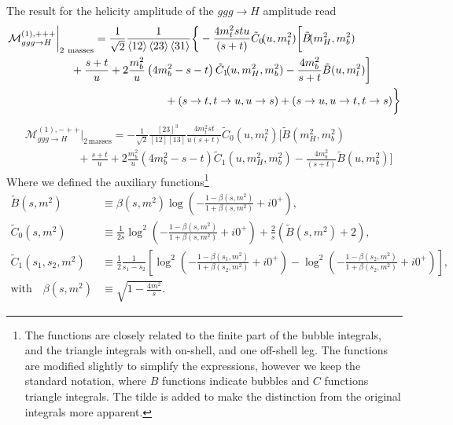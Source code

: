 The result for the helicity amplitude of the $ggg \rightarrow H$ amplitude read
\begin{equation}
\begin{split}
&\mathcal{M}^{(1),+++}_{ggg \rightarrow H} \bigg \vert_{2\ \text{masses}} = \frac{1}{\sqrt{2}} \frac{1}{\braket{12}\braket{23} \braket{31}} \bigg \lbrace -  \frac{4 m_t^2 s t u}{(s + t)} \tilde{C}_0\!(u, m_t^2) \bigg [ \tilde{B}\!(m_H^2, m_b^2)  \\
& \hspace{2cm} + \frac{s + t}{u} + 2 \frac{m_b^2}{u} \left( 4 m_b^2 - s - t \right) \tilde{C}_1\!(u, m_H^2, m_b^2) - \frac{4 m_b^2}{s + t} \tilde{B}(u, m_l^2)  \bigg ] \\
& \hspace{5cm} + (s \rightarrow t, t \rightarrow u, u \rightarrow s) + (s \rightarrow u, u \rightarrow t, t \rightarrow s)\bigg \rbrace
\label{eq:5:ggg_ppp}
\end{split}
\end{equation}
%
%
\begin{equation}
\begin{split}
&\mathcal{M}^{(1),-++}_{ggg \rightarrow H} \bigg \vert_{2\, \text{masses}} = -\frac{1}{\sqrt{2}} \frac{[23]^3}{[12][13]} \frac{4 m_t^2 s t }{u(s + t)} \tilde{C}_0\!(u, m_t^2) \bigg [ \tilde{B}\!(m_H^2, m_b^2) \\
& \hspace{2cm} + \frac{s + t}{u} + 2 \frac{m_b^2}{u} \left(4 m_b^2 - s - t\right) \tilde{C}_1\!(u, m_H^2, m_b^2) - \frac{4 m_b^2}{(s + t)} \tilde{B}\!(u, m_b^2) \bigg ]
\label{eq:5:ggg_mpp}
\end{split}
\end{equation}
Where we defined the auxiliary functions\footnote{The functions are closely related to the finite part of the bubble integrals, and the triangle integrals with on-shell, and one off-shell leg. The functions are modified slightly to simplify the expressions, however we keep the standard notation, where $B$ functions indicate bubbles and $C$ functions triangle integrals. The tilde is added to make the distinction from the original integrals more apparent.}
\begin{equation}
\begin{split}
\tilde{B}\!(s, m^2) &\equiv \beta(s, m^2) \log\!\left(- \frac{1 - \beta(s, m^2)}{1 + \beta(s, m^2)} + i 0^+ \right), \\
\tilde{C}_0\!(s, m^2) &\equiv \frac{1}{2 s} \log^2\!\left(- \frac{1 - \beta(s, m^2)}{1 + \beta(s, m^2)} + i 0^+ \right) + \frac{2}{s} \left(\tilde{B}\!(s, m^2) + 2 \right), \\
\tilde{C}_1\!(s_1, s_2, m^2) &\equiv \frac{1}{2} \frac{1}{s_1 - s_2} \left[ \log^2\!\left(-\frac{1 - \beta(s_1, m^2)}{1 + \beta(s_2, m^2)} + i 0^+ \right) - \log^2\!\left(- \frac{1 - \beta(s_2, m^2)}{1 + \beta(s_2, m^2)} + i0^+\right) \right], \\
\text{with} \quad \beta(s, m^2) &\equiv \sqrt{1 - \frac{4 m^2}{s}}.
\label{eq:5:function_definitions}
\end{split}
\end{equation}
